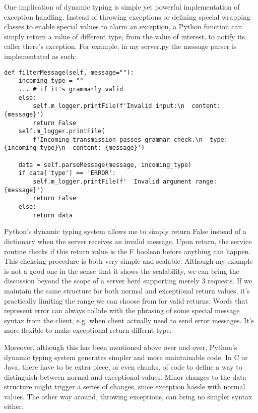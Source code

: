 \documentclass[letterpaper,twocolumn,10pt]{article}
\begin{document}
One implication of dynamic typing is simple yet powerful implementation of exception handling.
Instead of throwing exceptions or defining special wrapping classes to enable special values to alarm an exception,
a Python function can simply return a value of different type, from the value of interest, to notify its caller there's exception.
For example, in my server.py the message parser is implementated as such:
\begin{lstlisting}[breaklines=true]
def filterMessage(self, message=""):
    incoming_type = ""
    ... # if it's grammarly valid
    else:
        self.m_logger.printFile(f'Invalid input:\n  content: {message}')
        return False
    self.m_logger.printFile(
        f'Incoming transmission passes grammar check.\n  type: {incoming_type}\n  content: {message}')

    data = self.parseMessage(message, incoming_type)
    if data['type'] == 'ERROR':
        self.m_logger.printFile(f'  Invalid argument range: {message}')
        return False
    else:
        return data
\end{lstlisting}
Python's dynamic typing system allows me to simply return False instead of a dictionary when the server receives an invalid message.
Upon return, the service routine checks if this return value is the F boolean before anything can happen.
This chekcing procedure is both very simple and scalable. 
Although my example is not a good one in the sense that it shows the scalability, we can bring the discussion beyond the scope of a server herd supporting merely 3 requests.
If we maintain the same structure for both normal and exceptional return values, it's practically limiting the range we can choose from for valid returns.
Words that represent error can always collide with the phrasing of some special message syntax from the client, e.g. when client actually need to send error messages.
It's more flexible to make exceptional return differnt type.

Moreover, although this has been mentioned above over and over, Python's dynamic typing system generates simpler and more maintainable code.
In C or Java, there have to be extra piece, or even chunks, of code to define a way to distinguish between normal and exceptional values.
Minor changes to the data structure might trigger a series of changes, since exception hassle with normal values.
The other way around, throwing exceptions, can bring no simpler syntax either.

\end{document}
